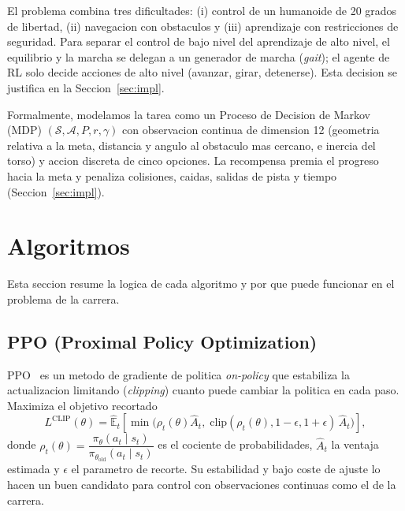 \documentclass[conference]{IEEEtran}
\begin{document}
El problema combina tres dificultades: (i) control de un humanoide de 20 grados
de libertad, (ii) navegacion con obstaculos y (iii) aprendizaje con
restricciones de seguridad. Para separar el control de bajo nivel del
aprendizaje de alto nivel, el equilibrio y la marcha se delegan a un generador
de marcha (\emph{gait}); el agente de RL solo decide acciones de alto nivel
(avanzar, girar, detenerse). Esta decision se justifica en la
Seccion~\ref{sec:impl}.

Formalmente, modelamos la tarea como un Proceso de Decision de Markov (MDP)
$(\mathcal{S}, \mathcal{A}, P, r, \gamma)$ con observacion continua de dimension
12 (geometria relativa a la meta, distancia y angulo al obstaculo mas cercano,
e inercia del torso) y accion discreta de cinco opciones. La recompensa premia
el progreso hacia la meta y penaliza colisiones, caidas, salidas de pista y
tiempo (Seccion~\ref{sec:impl}).

\section{Algoritmos}
Esta seccion resume la logica de cada algoritmo y por que puede funcionar en el
problema de la carrera.

\subsection{PPO (Proximal Policy Optimization)}
PPO~\cite{ppo} es un metodo de gradiente de politica \emph{on-policy} que
estabiliza la actualizacion limitando (\emph{clipping}) cuanto puede cambiar la
politica en cada paso. Maximiza el objetivo recortado
\begin{equation}
L^{\text{CLIP}}(\theta) = \hat{\mathbb{E}}_t\!\left[
\min\!\big(\rho_t(\theta)\hat{A}_t,\;
\text{clip}(\rho_t(\theta), 1-\epsilon, 1+\epsilon)\,\hat{A}_t\big)\right],
\end{equation}
donde $\rho_t(\theta) = \dfrac{\pi_\theta(a_t\mid s_t)}{\pi_{\theta_{\text{old}}}(a_t\mid s_t)}$
es el cociente de probabilidades, $\hat{A}_t$ la ventaja estimada y $\epsilon$ el
parametro de recorte. Su estabilidad y bajo coste de ajuste lo hacen un buen
candidato para control con observaciones continuas como el de la carrera.
\end{document}
